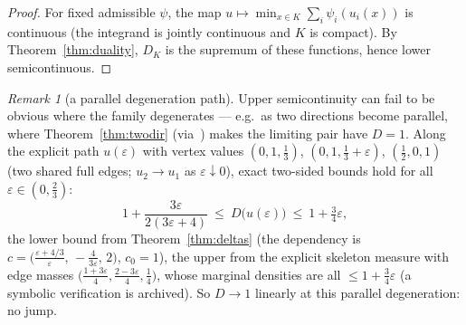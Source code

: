\documentclass[11pt,reqno]{amsart}
\theoremstyle{plain}
\theoremstyle{definition}
\theoremstyle{remark}
\newtheorem{remark}[theorem]{Remark}
\begin{document}
\begin{proof}
For fixed admissible $\psi$, the map
$u\mapsto\min_{x\in K}\sum_i\psi_i(u_i(x))$ is continuous (the integrand is
jointly continuous and $K$ is compact). By Theorem~\ref{thm:duality},
$D_K$ is the supremum of these functions, hence lower semicontinuous.
\end{proof}

\begin{remark}[a parallel degeneration path]\label{rem:parallelpath}
Upper semicontinuity can fail to be obvious where the family degenerates ---
e.g.\ as two directions become parallel, where Theorem~\ref{thm:twodir}
(via~\cite{Gardner88}) makes the limiting pair have $D=1$. Along the
explicit path $u(\varepsilon)$ with vertex values $(0,1,\tfrac13)$,
$(0,1,\tfrac13+\varepsilon)$, $(\tfrac12,0,1)$ (two shared full edges;
$u_2\to u_1$ as $\varepsilon\downarrow0$), exact two-sided bounds hold for
all $\varepsilon\in(0,\tfrac23)$:
\[
1+\frac{3\varepsilon}{2(3\varepsilon+4)}\ \le\ D\bigl(u(\varepsilon)\bigr)
\ \le\ 1+\tfrac34\varepsilon ,
\]
the lower bound from Theorem~\ref{thm:deltas} (the dependency is
$c=\bigl(\frac{\varepsilon+4/3}\varepsilon,\,-\frac4{3\varepsilon},\,2\bigr)$,
$c_0=1$), the upper from the explicit skeleton measure with edge masses
$\bigl(\frac{1+3\varepsilon}4,\frac{2-3\varepsilon}4,\frac14\bigr)$, whose
marginal densities are all $\le1+\tfrac34\varepsilon$ (a symbolic
verification is archived). So $D\to1$ linearly at this parallel
degeneration: no jump.
\end{remark}
\end{document}
